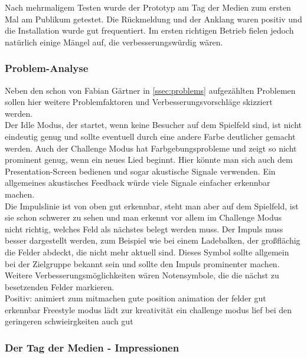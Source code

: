 \label{ssec:Praxis}

Nach mehrmaligem Testen wurde der Prototyp am Tag der Medien zum ersten Mal am Publikum getestet. Die Rückmeldung und der Anklang waren positiv und die Installation wurde gut frequentiert. Im ersten richtigen Betrieb fielen jedoch natürlich einige Mängel auf, die verbesserungswürdig wären.  
 
\subsubsection{Problem-Analyse}
Neben den schon von Fabian Gärtner in \autoref{ssec:problems} aufgezählten Problemen sollen hier weitere Problemfaktoren und Verbesserungsvorschläge skizziert werden.\\
Der Idle Modus, der startet, wenn keine Besucher auf dem Spielfeld sind, ist nicht eindeutig genug und sollte eventuell durch eine andere Farbe deutlicher gemacht werden. Auch der Challenge Modus hat Farbgebungsprobleme und zeigt so nicht prominent genug, wenn ein neues Lied beginnt. Hier könnte man sich auch dem Presentation-Screen bedienen und sogar akustische Signale verwenden. Ein allgemeines akustisches Feedback würde viele Signale einfacher erkennbar machen.\\
Die Impulslinie ist von oben gut erkennbar, steht man aber auf dem Spielfeld, ist sie schon schwerer zu sehen und man erkennt vor allem im Challenge Modus nicht richtig, welches Feld als nächstes belegt werden muss. Der Impuls muss besser dargestellt werden, zum Beispiel wie bei einem Ladebalken, der großflächig die Felder abdeckt, die nicht mehr aktuell sind. Dieses Symbol sollte allgemein bei der Zielgruppe bekannt sein und sollte den Impuls prominenter machen. Weitere Verbesserungsmöglichkeiten wären Notensymbole, die die nächst zu besetzenden Felder markieren.\\ 


Positiv: animiert zum mitmachen
gute position
animation der felder gut erkennbar
Freestyle modus lädt zur kreativität ein
challenge modus lief bei den geringeren schwieirgkeiten auch gut
\subsubsection{Der Tag der Medien - Impressionen}